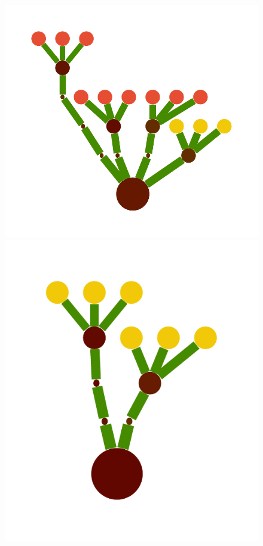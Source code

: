 \documentclass[a4paper,10pt]{article}
\begin{document}
\begin{figure}[b]
\begin{center}
\includegraphics[scale=.26]{../figures/vector/1-tree-1.pdf}
\includegraphics[scale=.26]{../figures/vector/1-tree-3.pdf}

\end{center}
\end{figure}
\end{document}
